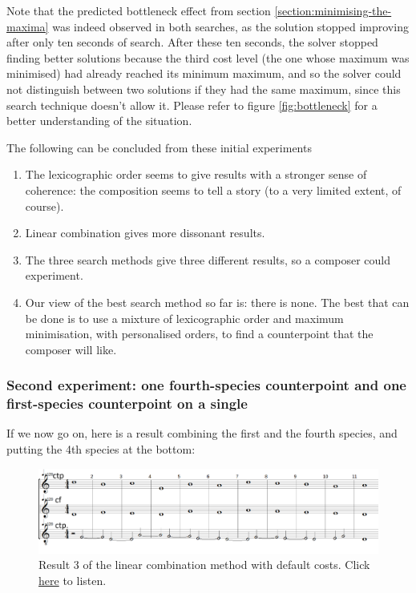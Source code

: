 Note that the predicted bottleneck effect from section \ref{section:minimising-the-maxima} was indeed observed in both searches, as the solution stopped improving after only ten seconds of search. After these ten seconds, the solver stopped finding better solutions because the third cost level (the one whose maximum was minimised) had already reached its minimum maximum, and so the solver could not distinguish between two solutions if they had the same maximum, since this search technique doesn't allow it. Please refer to figure \ref{fig:bottleneck} for a better understanding of the situation.

The following can be concluded from these initial experiments
\begin{enumerate}
    \item The lexicographic order seems to give results with a stronger sense of coherence: the composition seems to tell a story (to a very limited extent, of course).
    \item Linear combination gives more dissonant results.
    \item The three search methods give three different results, so a composer could experiment.
    \item Our view of the best search method so far is: there is none. The best that can be done is to use a mixture of lexicographic order and maximum minimisation, with personalised orders, to find a counterpoint that the composer will like.
\end{enumerate}
\subsubsection{Second experiment: one fourth-species counterpoint and one first-species counterpoint on a single \cf}

If we now go on, here is a result combining the first and the fourth species, and putting the 4th species at the bottom:
\begin{figure}[h]
    \centering
    \includegraphics[width=1\textwidth]{Images/Experiments/linear-combination-4sp.png}
    \caption{Result 3 of the linear combination method with default costs. Click \href{https://youtu.be/_VrM76hp1v8}{here} to listen.}
    \label{fig:combili-4sp}
\end{figure}

